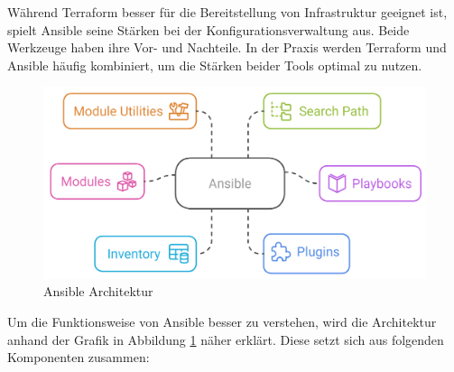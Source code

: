     Während Terraform besser für die Bereitstellung von Infrastruktur geeignet ist, spielt Ansible seine Stärken bei der Konfigurationsverwaltung aus. Beide Werkzeuge haben ihre Vor- und Nachteile. In der Praxis werden Terraform und Ansible häufig kombiniert, 
    um die Stärken beider Tools optimal zu nutzen.
    \cite{EA:Web45, EA:Web48}
    
    \begin{figure}[H]
        \centering
        \includegraphics[width=0.7\linewidth]{images/EA/ansible-architecture.png}
        \caption{Ansible Architektur}
        \label{fig:ansible-architecture}
    \end{figure}

    Um die Funktionsweise von Ansible besser zu verstehen, wird die Architektur anhand der Grafik in Abbildung \ref{fig:ansible-architecture} näher erklärt. Diese setzt sich aus folgenden Komponenten zusammen:

